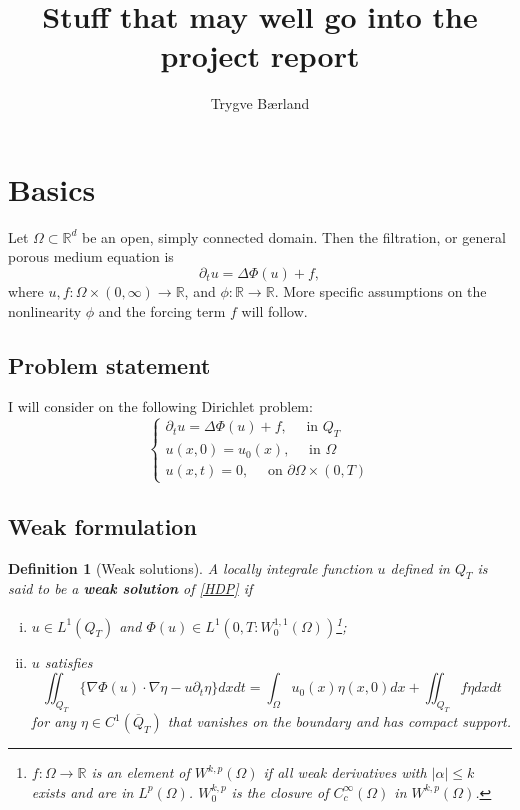 \documentclass[11pt, a4paper]{article}
\begin{document}
\title{Stuff that may well go into the project report}
\author{Trygve Bærland}
\maketitle
{}
\section{Basics}
\newtheorem{theorem}{Theorem}
\newtheorem{mydef}{Definition}
\newtheorem{ex}{Example}

Let $\Omega \subset \mathbb{R}^d$ be an open, simply connected domain. Then the filtration, or general porous medium equation is
\begin{equation}
\label{GPME}
	\partial_t u = \Delta \Phi(u) + f,
\end{equation}
 where $u, f: \Omega \times (0,\infty) \to \mathbb{R}$, and $\phi: \mathbb{R} \to \mathbb{R}$. More specific assumptions on the nonlinearity $\phi$  and the forcing term $f$ will follow.

\subsection{Problem statement}
I will consider on the following Dirichlet problem:
\begin{equation}
\label{HDP}
	\begin{cases}
		\partial_t u = \Delta \Phi(u) + f, \quad \text{ in } Q_T \\
		u(x,0) = u_0(x), \quad \text{ in } \Omega \\
		u(x,t) = 0, \quad \text{ on } \partial\Omega \times (0,T)
	\end{cases}
\end{equation}

\subsection{Weak formulation}
\begin{mydef}[Weak solutions]
A locally integrale function $u$ defined in $Q_T$ is said to be a \textbf{weak solution} of \ref{HDP} if
\begin{enumerate}[i)]
	\item $u \in L^1(Q_T)$ and $\Phi(u) \in L^1(0,T : W_0^{1,1}(\Omega))$\footnote{$f:\Omega \to \mathbb{R}$ is an element of $W^{k,p}(\Omega)$ if all weak derivatives with $|\alpha| \leq k$ exists and are in $L^p(\Omega)$. $W_0^{k,p}$ is the closure of $C^\infty_c(\Omega)$ in $W^{k,p}(\Omega)$.};
	\item $u$ satisfies
		\begin{equation}
		\label{weak}
		\iint_{Q_T} \{\nabla\Phi(u)\cdot \nabla\eta - u\partial_t \eta \}dxdt = \int_\Omega u_0(x)\eta(x,0)dx + \iint_{Q_T}f\eta dxdt
		\end{equation}
		for any $\eta \in C^1(\overline{Q}_T)$ that vanishes on the boundary and has compact support.
\end{enumerate}
\end{mydef}
\end{document}
